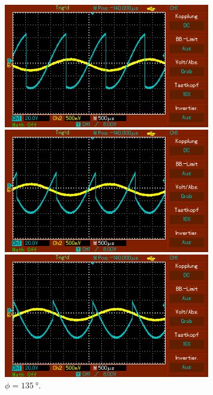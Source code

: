 \begin{figure}
\begin{minipage}{0.5\textwidth}
    \end{minipage}
    \vspace{1cm}
    \vfill
    \begin{minipage}{0.5\textwidth}
        \centering
        \includegraphics[width=0.8\textwidth]{bilder/90ohne.png}
        \caption{$\phi = \SI{90}{\degree}$.} 
        \label{fig:13}
    \end{minipage}
    \hfill
    \begin{minipage}{0.5\textwidth}
        \centering
        \includegraphics[width=0.8\textwidth]{bilder/135ohne.png}
        \caption{$\phi = \SI{135}{\degree}$.} 
        \label{fig:14}
    \end{minipage}
    \vspace{1cm}
    \vfill
    \begin{minipage}{0.5\textwidth}
        \centering
        \includegraphics[width=0.8\textwidth]{bilder/180ohne.png}

\end{minipage}
\end{figure}
